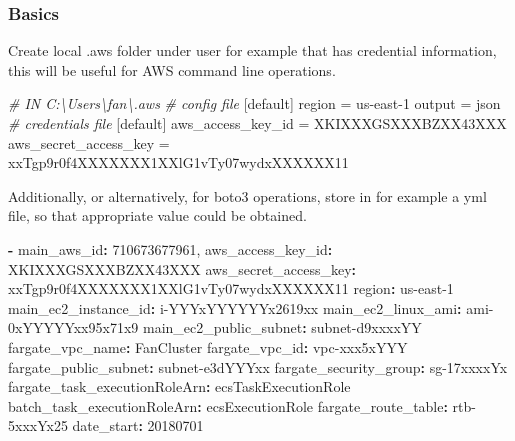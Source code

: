 \documentclass[
]{book}
\newenvironment{Shaded}{\begin{snugshade}}{\end{snugshade}}
\newcommand{\AttributeTok}[1]{\textcolor[rgb]{0.77,0.63,0.00}{#1}}
\newcommand{\CommentTok}[1]{\textcolor[rgb]{0.56,0.35,0.01}{\textit{#1}}}
\newcommand{\DecValTok}[1]{\textcolor[rgb]{0.00,0.00,0.81}{#1}}
\newcommand{\ExtensionTok}[1]{#1}
\newcommand{\FunctionTok}[1]{\textcolor[rgb]{0.00,0.00,0.00}{#1}}
\newcommand{\KeywordTok}[1]{\textcolor[rgb]{0.13,0.29,0.53}{\textbf{#1}}}
\newcommand{\NormalTok}[1]{#1}
\begin{document}
\hypertarget{basics}{%
\subsubsection{Basics}\label{basics}}

Create local .aws folder under user for example that has credential information, this will be useful for AWS command line operations.

\begin{Shaded}
\begin{Highlighting}[]
\CommentTok{# IN C:\textbackslash{}Users\textbackslash{}fan\textbackslash{}.aws}
\CommentTok{# config file}
\NormalTok{[}\ExtensionTok{default}\NormalTok{]}
\ExtensionTok{region}\NormalTok{ = us-east-1}
\ExtensionTok{output}\NormalTok{ = json}
\CommentTok{# credentials file}
\NormalTok{[}\ExtensionTok{default}\NormalTok{]}
\ExtensionTok{aws_access_key_id}\NormalTok{ = XKIXXXGSXXXBZXX43XXX}
\ExtensionTok{aws_secret_access_key}\NormalTok{ = xxTgp9r0f4XXXXXXX1XXlG1vTy07wydxXXXXXX11}
\end{Highlighting}
\end{Shaded}

Additionally, or alternatively, for boto3 operations, store in for example a yml file, so that appropriate value could be obtained.

\begin{Shaded}
\begin{Highlighting}[]
\KeywordTok{-}\AttributeTok{ }\FunctionTok{main_aws_id}\KeywordTok{:}\AttributeTok{ 710673677961,}
\AttributeTok{  }\FunctionTok{aws_access_key_id}\KeywordTok{:}\AttributeTok{ XKIXXXGSXXXBZXX43XXX}
\AttributeTok{  }\FunctionTok{aws_secret_access_key}\KeywordTok{:}\AttributeTok{ xxTgp9r0f4XXXXXXX1XXlG1vTy07wydxXXXXXX11}
\AttributeTok{  }\FunctionTok{region}\KeywordTok{:}\AttributeTok{ us-east-1}
\AttributeTok{  }\FunctionTok{main_ec2_instance_id}\KeywordTok{:}\AttributeTok{ i-YYYxYYYYYYx2619xx}
\AttributeTok{  }\FunctionTok{main_ec2_linux_ami}\KeywordTok{:}\AttributeTok{ ami-0xYYYYYxx95x71x9}
\AttributeTok{  }\FunctionTok{main_ec2_public_subnet}\KeywordTok{:}\AttributeTok{ subnet-d9xxxxYY}
\AttributeTok{  }\FunctionTok{fargate_vpc_name}\KeywordTok{:}\AttributeTok{ FanCluster}
\AttributeTok{  }\FunctionTok{fargate_vpc_id}\KeywordTok{:}\AttributeTok{ vpc-xxx5xYYY}
\AttributeTok{  }\FunctionTok{fargate_public_subnet}\KeywordTok{:}\AttributeTok{ subnet-e3dYYYxx}
\AttributeTok{  }\FunctionTok{fargate_security_group}\KeywordTok{:}\AttributeTok{ sg-17xxxxYx}
\AttributeTok{  }\FunctionTok{fargate_task_executionRoleArn}\KeywordTok{:}\AttributeTok{ ecsTaskExecutionRole}
\AttributeTok{  }\FunctionTok{batch_task_executionRoleArn}\KeywordTok{:}\AttributeTok{ ecsExecutionRole}
\AttributeTok{  }\FunctionTok{fargate_route_table}\KeywordTok{:}\AttributeTok{ rtb-5xxxYx25}
\AttributeTok{  }\FunctionTok{date_start}\KeywordTok{:}\AttributeTok{ }\DecValTok{20180701}
\end{Highlighting}
\end{Shaded}
\end{document}
